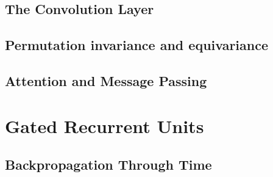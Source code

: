 \subsection{The Convolution Layer}
\subsection{Permutation invariance and equivariance}
\subsection{Attention and Message Passing}




\section{Gated Recurrent Units}
\subsection{Backpropagation Through Time}